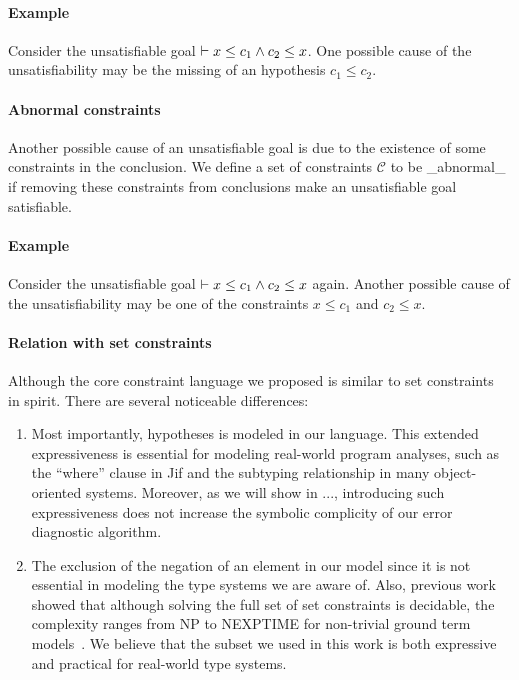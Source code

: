 \paragraph{Example}
Consider the unsatisfiable goal $\vdash x \leq c_1 \land c_2 \leq x$.
One possible cause of the unsatisfiability may be the missing of an
hypothesis $c_1\leq c_2$.

\paragraph{Abnormal constraints}

Another possible cause of an unsatisfiable goal is due to the
existence of some constraints in the conclusion. We define a set of
constraints $\mathcal{C}$ to be _abnormal_ if removing these
constraints from conclusions make an unsatisfiable goal satisfiable.

\paragraph{Example}
Consider the unsatisfiable goal $\vdash x \leq c_1 \land c_2 \leq x$
again. Another possible cause of the unsatisfiability may be one of
the constraints $x \leq c_1$ and $c_2 \leq x$. 

\paragraph{Relation with set constraints}

Although the core constraint language we proposed is similar to set
constraints~\cite{aiken-setconstraint} in spirit. There are several
noticeable differences:

\begin{enumerate}

\item Most importantly, hypotheses is modeled in our language. This extended
expressiveness is essential for modeling real-world program analyses, such as
the ``where'' clause in Jif and the subtyping relationship in many
object-oriented systems. Moreover, as we will show in ..., introducing such
expressiveness does not increase the symbolic complicity of our error
diagnostic algorithm.

\item The exclusion of the negation of an element in our model since
it is not essential in modeling the type systems we are aware of.
Also, previous work showed that although solving the full set of set
constraints is decidable, the complexity ranges from NP to NEXPTIME
for non-trivial ground term models~\cite{aiken-complexity}. We believe
that the subset we used in this work is both expressive and practical
for real-world type systems.

\end{enumerate}

